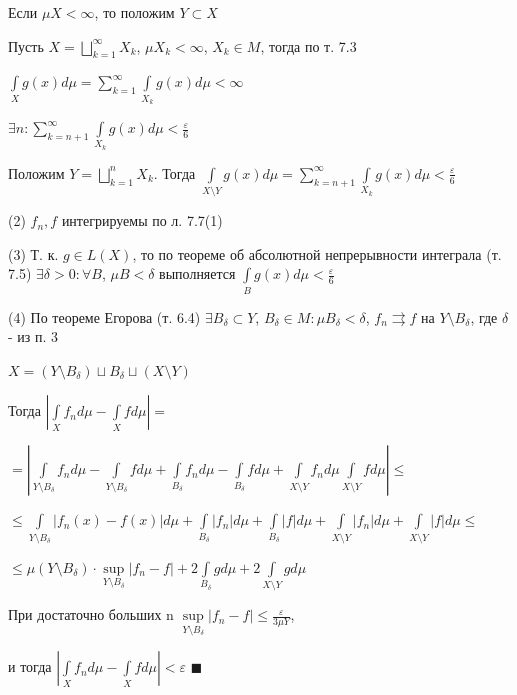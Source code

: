 \documentclass[a4paper]{report}
\begin{document}
Если $\mu X<\infty$, то положим $Y\subset X$

Пусть $X=\bigsqcup\limits_{k=1}^\infty X_k$, $\mu X_k<\infty$, $X_k\in M$, тогда по т. 7.3 

$\displaystyle\int\limits_X g(x)d\mu=\sum\limits_{k=1}^\infty\displaystyle\int\limits_{X_k}g(x)d\mu<\infty$

$\exists n\colon\sum\limits_{k=n+1}^\infty\displaystyle\int\limits_{X_k} g(x)d\mu<\frac\varepsilon6$

Положим $Y=\bigsqcup\limits_{k=1}^n X_k$. Тогда $\displaystyle\int\limits_{X\setminus Y}g(x)d\mu=\sum\limits_{k=n+1}^\infty\displaystyle\int\limits_{X_k} g(x)d\mu<\frac\varepsilon6$

(2) $f_n,f$ интегрируемы по л. 7.7(1)

(3) Т. к. $g\in L(X)$, то по теореме об абсолютной непрерывности интеграла (т. 7.5) $\exists\delta>0\colon\forall B$, $\mu B<\delta$ выполняется $\displaystyle\int\limits_B g(x)
d\mu<\frac\varepsilon6$

(4) По теореме Егорова (т. 6.4) $\exists B_\delta\subset Y$, $B_\delta\in M\colon \mu B_\delta<\delta$, $f_n\rightrightarrows f$ на $Y\setminus B_\delta$, где 
$\delta$ - из п. 3

$X=(Y\setminus B_\delta)\sqcup B_\delta\sqcup(X\setminus Y)$

Тогда $\left|\displaystyle\int\limits_X f_n d\mu-\displaystyle\int\limits_X fd\mu\right|=$

\noindent $=\left|\displaystyle\int\limits_{Y\setminus B_\delta}f_n d\mu-\displaystyle\int\limits_{Y\setminus B_\delta}fd\mu+\displaystyle\int\limits_{B_\delta}f_nd\mu-\displaystyle\int\limits_{B_\delta}fd\mu+\displaystyle\int\limits_{X\setminus Y}f_nd\mu \displaystyle\int\limits_{X\setminus Y}fd\mu\right|\le$

\noindent $\le\displaystyle\int\limits_{Y\setminus B_\delta}|f_n(x)-f(x)|d\mu+\displaystyle\int\limits_{B_\delta}|f_n|d\mu+\displaystyle\int\limits_{B_\delta}|f|d\mu+\displaystyle\int\limits_{X\setminus Y}|f_n|d\mu+\displaystyle\int\limits_{X\setminus Y}|f|d\mu\le$

\noindent $\le\mu(Y\setminus B_\delta)\cdot\sup\limits_{Y\setminus B_\delta}|f_n-f|+2\displaystyle\int\limits_{B_\delta}gd\mu+2\displaystyle\int\limits_{X\setminus Y}gd\mu$

 При достаточно больших n $\sup\limits_{Y\setminus B_\delta}|f_n-f|\le\displaystyle\frac{\varepsilon}{3\mu Y}$, 

и тогда $\left|\displaystyle\int\limits_X f_nd\mu-\displaystyle\int\limits_Xfd\mu\right|<\varepsilon$ $\blacksquare$
\bigskip
\end{document}
